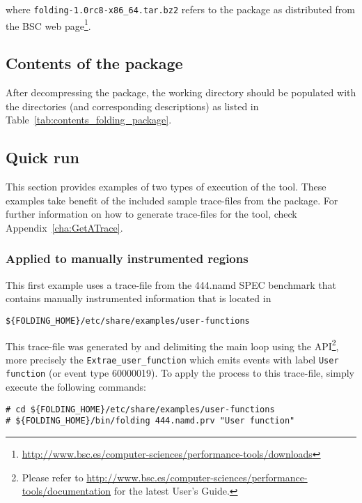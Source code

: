 where \texttt{folding-1.0rc8-x86\_64.tar.bz2} refers to the \FOLDING package as distributed from the BSC web page\footnote{\url{http://www.bsc.es/computer-sciences/performance-tools/downloads}}.

\subsection{Contents of the package}\label{subsec:ContentsOfInstallation}

After decompressing the package, the working directory should be populated with the directories (and corresponding descriptions) as listed in Table~\ref{tab:contents_folding_package}.



\subsection{Quick run}

This section provides examples of two types of execution of the \FOLDING tool.
These examples take benefit of the included sample trace-files from the package.
For further information on how to generate trace-files for the \FOLDING tool, check Appendix~\ref{cha:GetATrace}.

\subsubsection{Applied to manually instrumented regions}\label{subsubsec:ManualExample}

This first example uses a trace-file from the 444.namd SPEC benchmark that contains manually instrumented information that is located in 

\begin{verbatim}
${FOLDING_HOME}/etc/share/examples/user-functions
\end{verbatim}

This trace-file was generated by \EXTRAE and delimiting the main loop using the \EXTRAE API\footnote{Please refer to \url{http://www.bsc.es/computer-sciences/performance-tools/documentation} for the latest \EXTRAE User's Guide.}, more precisely the \texttt{Extrae\_user\_function} which emits events with label \texttt{User function} (or event type 60000019).
To apply the \FOLDING process to this trace-file, simply execute the following commands:

\begin{verbatim}
# cd ${FOLDING_HOME}/etc/share/examples/user-functions
# ${FOLDING_HOME}/bin/folding 444.namd.prv "User function"
\end{verbatim}

